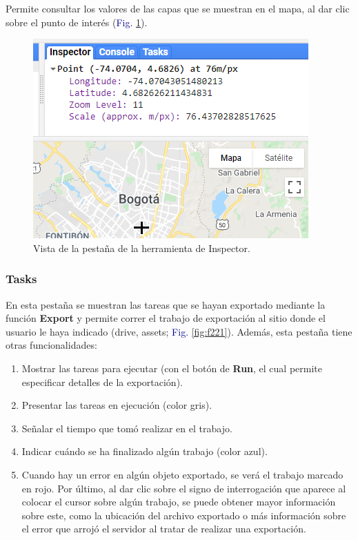 \documentclass[
  12pt,
  letterpaper,
  twoside]{book}
\providecommand{\tightlist}{%
  \setlength{\itemsep}{0pt}\setlength{\parskip}{0pt}}
\newcommand\boldpurple[1]{\textcolor{darkpurple}{\textbf{#1}}}
\begin{document}
Permite consultar los valores de las capas que se muestran en el mapa, al dar clic sobre el punto de interés (\textcolor{darkblue}{Fig.} \ref{fig:f220}).

\begin{figure}[H]

{\centering \includegraphics[width=0.95\linewidth]{Img/inspector} 

}

\caption{Vista de la pestaña de la herramienta de Inspector.}\label{fig:f220}
\end{figure}

\hypertarget{tasks}{%
\subsubsection*{Tasks}\label{tasks}}

En esta pestaña se muestran las tareas que se hayan exportado mediante la función \boldpurple{Export} y permite correr el trabajo de exportación al sitio donde el usuario le haya indicado (drive, assets; \textcolor{darkblue}{Fig.} \ref{fig:f221}). Además, esta pestaña tiene otras funcionalidades:

\begin{enumerate}
\def\labelenumi{\arabic{enumi}.}
\tightlist
\item
  Mostrar las tareas para ejecutar (con el botón de \textbf{Run}, el cual permite especificar detalles de la exportación).
\item
  Presentar las tareas en ejecución (color gris).
\item
  Señalar el tiempo que tomó realizar en el trabajo.
\item
  Indicar cuándo se ha finalizado algún trabajo (color azul).
\item
  Cuando hay un error en algún objeto exportado, se verá el trabajo marcado en rojo. Por último, al dar clic sobre el signo de interrogación que aparece al colocar el cursor sobre algún trabajo, se puede obtener mayor información sobre este, como la ubicación del archivo exportado o más información sobre el error que arrojó el servidor al tratar de realizar una exportación.
\end{enumerate}
\end{document}
